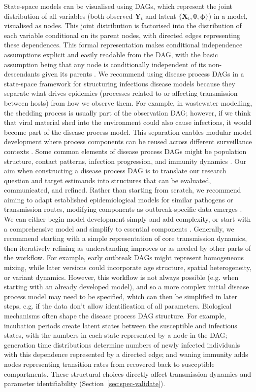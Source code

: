 \documentclass{article}
\begin{document}
State-space models can be visualised using \ac{DAG}s, which represent the joint distribution of all variables (both observed $\boldsymbol{Y}_t$ and latent $\{\boldsymbol{X}_t, \boldsymbol{\theta}, \boldsymbol{\phi}\}$) in a model, visualised as nodes. This joint distribution is factorised into the distribution of each variable conditional on its parent nodes, with directed edges representing these dependences. This formal representation makes conditional independence assumptions explicit and easily readable from the \ac{DAG}, with the basic assumption being that any node is conditionally independent of its non-descendants given its parents \citep{lauritzen1996graphical}. We recommend using disease process \ac{DAG}s in a state-space framework for structuring infectious disease models because they separate what drives epidemics (processes related to or affecting transmission between hosts) from how we observe them. 
For example, in wastewater modelling, the shedding process is usually part of the observation \ac{DAG}; however, if we think that viral material shed into the environment could also cause infections, it would become part of the disease process model.
This separation enables modular model development where process components can be reused across different surveillance contexts \citep{nicholson2022interoperability}.
Some common elements of disease process \ac{DAG}s might be population structure, contact patterns, infection progression, and immunity dynamics \citep{deangelis2018analysing}. 
Our aim when constructing a disease process \ac{DAG} is to translate our research question and target estimands into structures that can be evaluated, communicated, and refined.
Rather than starting from scratch, we recommend aiming to adapt established epidemiological models for similar pathogens or transmission routes, modifying components as outbreak-specific data emerges \citep{gelman2020bayesian}.
We can either begin model development simply and add complexity, or start with a comprehensive model and simplify to essential components \citep{gelman2020bayesian}.
Generally, we recommend starting with a simple representation of core transmission dynamics, then iteratively refining as understanding improves or as needed by other parts of the workflow.
For example, early outbreak \ac{DAG}s might represent homogeneous mixing, while later versions could incorporate age structure, spatial heterogeneity, or variant dynamics.
However, this workflow is not always possible (e.g. when starting with an already developed model), and so a more complex initial disease process model may need to be specified, which can then be simplified in later steps, e.g. if the data don't allow identification of all parameters.
Biological mechanisms often shape the disease process \ac{DAG} structure. For example, incubation periods create latent states between the susceptible and infectious states, with the numbers in each state represented by a node in the \ac{DAG}; generation time distributions determine numbers of newly infected individuals with this dependence represented by a directed edge; and waning immunity adds nodes representing transition rates from recovered back to susceptible compartments.
These structural choices directly affect transmission dynamics and parameter identifiability (Section~\ref{sec:spec-validate}).
\end{document}
